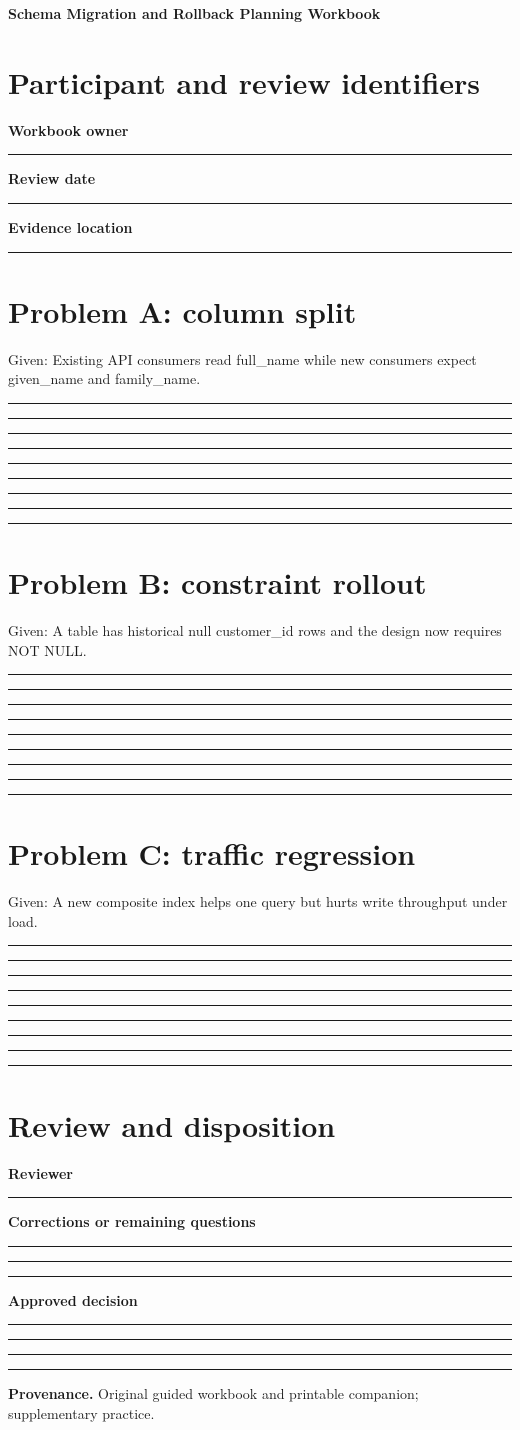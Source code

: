 \documentclass[11pt,letterpaper]{article}
\newcommand{\ResponseLine}{\par\vspace{1.05em}\noindent\rule{\linewidth}{0.4pt}\par}
\newcommand{\ResponseArea}{\ResponseLine\ResponseLine\ResponseLine}
\begin{document}
\begin{center}
{\LARGE\bfseries\color{navy} Schema Migration and Rollback Planning Workbook}\par
\vspace{0.25em}{\large Printable Blank | response fields left empty}\par
{}
\end{center}
\vspace{0.8em}
\section{Participant and review identifiers}
\textbf{Workbook owner}\ResponseLine\textbf{Review date}\ResponseLine\textbf{Evidence location}\ResponseLine
\section{Problem A: column split}
Given: Existing API consumers read full\_name while new consumers expect given\_name and family\_name.


\ResponseArea\ResponseArea\ResponseArea
\section{Problem B: constraint rollout}
Given: A table has historical null customer\_id rows and the design now requires NOT NULL.


\ResponseArea\ResponseArea\ResponseArea
\section{Problem C: traffic regression}
Given: A new composite index helps one query but hurts write throughput under load.


\ResponseArea\ResponseArea\ResponseArea
\section{Review and disposition}
\textbf{Reviewer}\ResponseLine\textbf{Corrections or remaining questions}\ResponseArea\textbf{Approved decision}\ResponseArea
\vfill
\hrule
{\footnotesize\textbf{Provenance.} Original guided workbook and printable companion; supplementary practice.}
\end{document}
